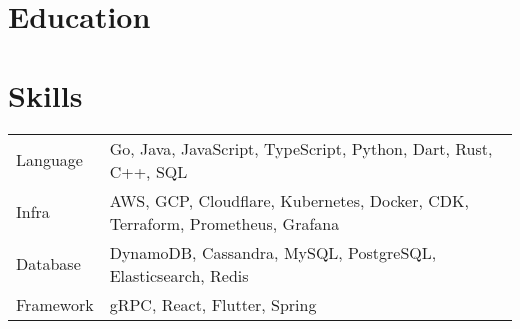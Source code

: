 \documentclass[11pt, letterpaper]{simple-cv}
\begin{document}
\section{Education}
{}

\section{Skills}
\begin{flushleft}
	\begin{tabular}{@{}ll@{}}
		Language  & Go, Java, JavaScript, TypeScript, Python, Dart, Rust, C++, SQL \\
		Infra     & AWS, GCP, Cloudflare, Kubernetes, Docker, CDK, Terraform, Prometheus, Grafana \\
		Database  & DynamoDB, Cassandra, MySQL, PostgreSQL, Elasticsearch, Redis  \\
		Framework & gRPC, React, Flutter, Spring \\
	\end{tabular}
\end{flushleft}
\end{document}
